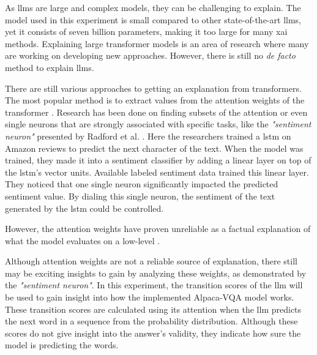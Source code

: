         As \glspl{llm} are large and complex models, they can be challenging to explain. The model used in this experiment is small compared to other state-of-the-art \glspl{llm}, yet it consists of seven billion parameters, making it too large for many \gls{xai} methods. Explaining large transformer models is an area of research where many are working on developing new approaches. However, there is still no \textit{de facto} method to explain \glspl{llm}.

        There are still various approaches to getting an explanation from transformers. The most popular method is to extract values from the attention weights of the transformer \cite{cheferGenericAttentionModelExplainability2021, cheferTransformerInterpretabilityAttention2021, barkanGradSAMExplainingTransformers2021, bohleHolisticallyExplainableVision2023}. Research has been done on finding subsets of the attention or even single neurons that are strongly associated with specific tasks, like the \textit{"sentiment neuron"} presented by Radford et al. \cite{radfordLearningGenerateReviews2017}. Here the researchers trained a \gls{lstm} on Amazon reviews to predict the next character of the text. When the model was trained, they made it into a sentiment classifier by adding a linear layer on top of the \gls{lstm}'s vector units. Available labeled sentiment data trained this linear layer. They noticed that one single neuron significantly impacted the predicted sentiment value. By dialing this single neuron, the sentiment of the text generated by the \gls{lstm} could be controlled. 
        
        However, the attention weights have proven unreliable as a factual explanation of what the model evaluates on a low-level \cite{serranoAttentionInterpretable2019, jainAttentionNotExplanation2019, abnarQuantifyingAttentionFlow2020}. 

        Although attention weights are not a reliable source of explanation, there still may be exciting insights to gain by analyzing these weights, as demonstrated by the \textit{"sentiment neuron"}.
        In this experiment, the transition scores of the \gls{llm} will be used to gain insight into how the implemented Alpaca-VQA model works. 
        These transition scores are calculated using its attention when the \gls{llm} predicts the next word in a sequence from the probability distribution. Although these scores do not give insight into the answer's validity, they indicate how sure the model is predicting the words.  

